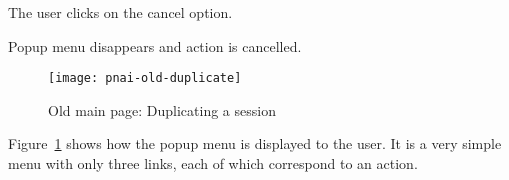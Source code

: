 \begin{center}
\begin{usecase}
{\begin{usecasepath}[c]
        \setcounter{enumi}{4}
        \item The user clicks on the cancel option.
        \item Popup menu disappears and action is cancelled.
      \end{usecasepath}
    }
  \end{usecase}
\end{center}

\begin{figure}[htbp]
  \centering
    \texttt{[image: pnai-old-duplicate]}
  \caption{Old main  page: Duplicating a session}
  \label{fig:pnai-old-duplicate}
\end{figure}

Figure~\ref{fig:pnai-old-duplicate} shows how the popup menu is displayed to the user.
It is a very simple menu with only three links, each of which correspond to an action.
